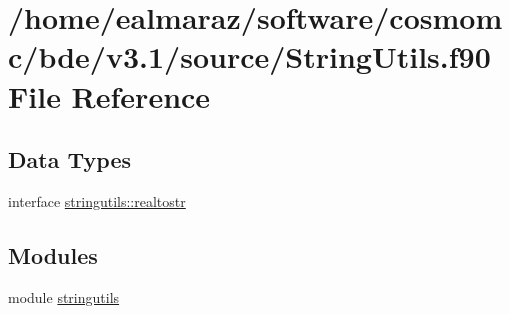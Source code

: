 \hypertarget{StringUtils_8f90}{}\section{/home/ealmaraz/software/cosmomc/bde/v3.1/source/\+String\+Utils.f90 File Reference}
\label{StringUtils_8f90}
\subsection*{Data Types}
\begin{DoxyCompactItemize}
\item 
interface \mbox{\hyperlink{interfacestringutils_1_1realtostr}{stringutils\+::realtostr}}
\end{DoxyCompactItemize}
\subsection*{Modules}
\begin{DoxyCompactItemize}
\item 
module \mbox{\hyperlink{namespacestringutils}{stringutils}}
\end{DoxyCompactItemize}
